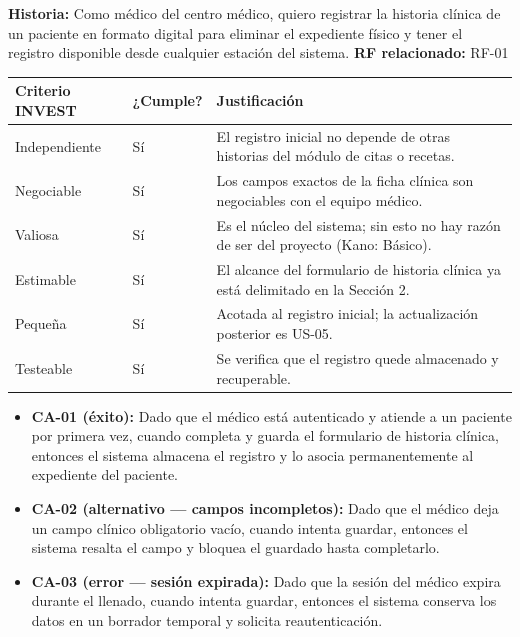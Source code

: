 \documentclass[11pt,a4paper]{article}
\providecommand{\tightlist}{%
	\setlength{\itemsep}{0pt}\setlength{\parskip}{0pt}}
\begin{document}
	\textbf{Historia:} Como médico del centro médico, quiero registrar la historia clínica de un paciente en formato digital para eliminar el expediente físico y tener el registro disponible desde cualquier estación del sistema.
	\textbf{RF relacionado:} RF-01
	
	\begin{longtable}{p{} p{} p{}}
		
		
		\toprule
		\textbf{Criterio INVEST} &
		\textbf{¿Cumple?} &
		\textbf{Justificación} \\
		\midrule
		\endhead
		
		Independiente & Sí & El registro inicial no depende de otras historias del módulo de citas o recetas. \\
		Negociable & Sí & Los campos exactos de la ficha clínica son negociables con el equipo médico. \\
		Valiosa & Sí & Es el núcleo del sistema; sin esto no hay razón de ser del proyecto (Kano: Básico). \\
		Estimable & Sí & El alcance del formulario de historia clínica ya está delimitado en la Sección 2. \\
		Pequeña & Sí & Acotada al registro inicial; la actualización posterior es US-05. \\
		Testeable & Sí & Se verifica que el registro quede almacenado y recuperable. \\
		
		\bottomrule
	\end{longtable}
	
	\begin{itemize}
		\tightlist
		\item
		\textbf{CA-01 (éxito):} Dado que el médico está autenticado y atiende a un paciente por primera vez, cuando completa y guarda el formulario de historia clínica, entonces el sistema almacena el registro y lo asocia permanentemente al expediente del paciente.
		\item
		\textbf{CA-02 (alternativo --- campos incompletos):} Dado que el médico deja un campo clínico obligatorio vacío, cuando intenta guardar, entonces el sistema resalta el campo y bloquea el guardado hasta completarlo.
		\item
		\textbf{CA-03 (error --- sesión expirada):} Dado que la sesión del médico expira durante el llenado, cuando intenta guardar, entonces el sistema conserva los datos en un borrador temporal y solicita reautenticación.
	\end{itemize}
	
\end{document}
